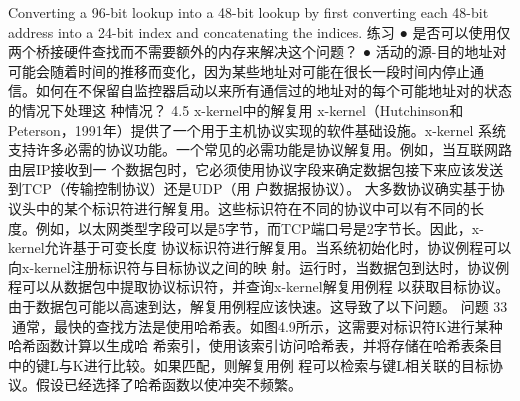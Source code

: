 Converting a 96-bit lookup into a 48-bit lookup by first converting each 48-bit address into a
24-bit index and concatenating the indices.
练习
 ● 是否可以使用仅两个桥接硬件查找而不需要额外的内存来解决这个问题？
 ● 活动的源-目的地址对可能会随着时间的推移而变化，因为某些地址对可能在很长一段时间内停止通
   信。如何在不保留自监控器启动以来所有通信过的地址对的每个可能地址对的状态的情况下处理这
   种情况？
4.5 x-kernel中的解复用
x-kernel（Hutchinson和Peterson，1991年）提供了一个用于主机协议实现的软件基础设施。x-kernel
系统支持许多必需的协议功能。一个常见的必需功能是协议解复用。例如，当互联网路由层IP接收到一
个数据包时，它必须使用协议字段来确定数据包接下来应该发送到TCP（传输控制协议）还是UDP（用
户数据报协议）。
大多数协议确实基于协议头中的某个标识符进行解复用。这些标识符在不同的协议中可以有不同的长
度。例如，以太网类型字段可以是5字节，而TCP端口号是2字节长。因此，x-kernel允许基于可变长度
协议标识符进行解复用。当系统初始化时，协议例程可以向x-kernel注册标识符与目标协议之间的映
射。运行时，当数据包到达时，协议例程可以从数据包中提取协议标识符，并查询x-kernel解复用例程
以获取目标协议。由于数据包可能以高速到达，解复用例程应该快速。这导致了以下问题。
问题
                                                                                                 33
通常，最快的查找方法是使用哈希表。如图4.9所示，这需要对标识符K进行某种哈希函数计算以生成哈
希索引，使用该索引访问哈希表，并将存储在哈希表条目中的键L与K进行比较。如果匹配，则解复用例
程可以检索与键L相关联的目标协议。假设已经选择了哈希函数以使冲突不频繁。




